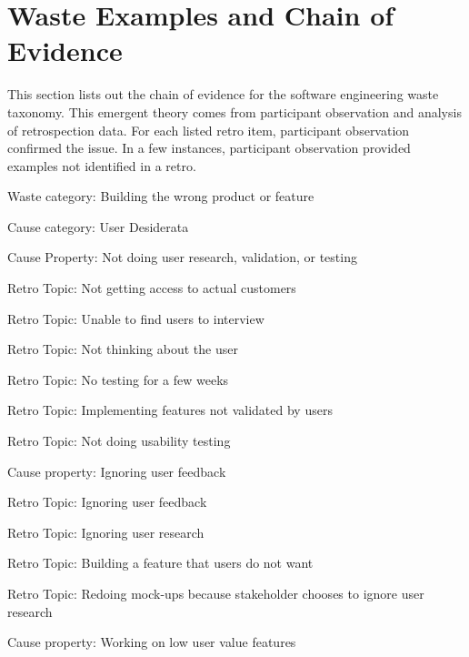 
\chapter{Waste Examples and Chain of Evidence}
\label{AppendixChainOfEvidence}

This section lists out the chain of evidence for the software engineering waste taxonomy. This emergent theory comes from participant observation and analysis of retrospection data. For each listed retro item, participant observation confirmed the issue. In a few instances, participant observation provided examples not identified in a retro. 




Waste category: Building the wrong product or feature

\quad Cause category: User Desiderata

\quad \quad Cause Property: Not doing user research, validation, or testing

\quad \quad \quad Retro Topic: Not getting access to actual customers

\quad \quad \quad Retro Topic: Unable to find users to interview

\quad \quad \quad Retro Topic: Not thinking about the user

\quad \quad \quad Retro Topic: No testing for a few weeks

\quad \quad \quad Retro Topic: Implementing features not validated by users

\quad \quad \quad Retro Topic: Not doing usability testing

\quad \quad Cause property: Ignoring user feedback

\quad \quad \quad Retro Topic: Ignoring user feedback

\quad \quad \quad Retro Topic: Ignoring user research

\quad \quad \quad Retro Topic: Building a feature that users do not want

\quad \quad \quad Retro Topic: Redoing mock-ups because stakeholder chooses to ignore user research

\quad \quad Cause property: Working on low user value features

